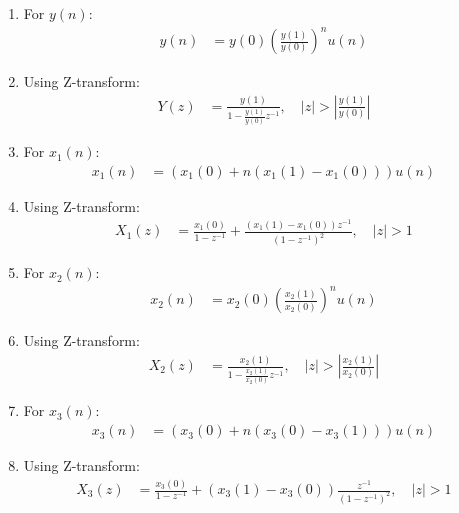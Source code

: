 \documentclass[journal,12pt,twocolumn]{IEEEtran}
\theoremstyle{remark}
\begin{document}
\begin{enumerate}

\item For $y(n)$:
    \begin{align}
        y(n) &= y(0)\left(\frac{y(1)}{y(0)}\right)^n u(n)
    \end{align}
    \item Using Z-transform:
    \begin{align}
        Y(z) &= \frac{y(1)}{1-\frac{y(1)}{y(0)}z^{-1}}, \quad \left|z\right|>\left|\frac{y(1)}{y(0)}\right|
    \end{align}
    
    \item For $x_1(n)$:
    \begin{align}
        x_1(n) &= (x_1(0) + n(x_1(1)-x_1(0)))u(n)
    \end{align}
    \item Using Z-transform:
    \begin{align}
        X_1(z) &= \frac{x_1(0)}{1-z^{-1}} + \frac{(x_1(1)-x_1(0))z^{-1}}{(1-z^{-1})^2} , \quad |z| > 1
    \end{align}

    \item For $x_2(n)$:
    \begin{align}
        x_2(n) &= x_2(0)\left(\frac{x_2(1)}{x_2(0)}\right)^n u(n)
    \end{align}
    \item Using Z-transform:
    \begin{align}
        X_2(z) &= \frac{x_2(1)}{1-\frac{x_2(1)}{x_2(0)}z^{-1}},  \quad \left|z\right|>\left|\frac{x_2(1)}{x_2(0)}\right|
    \end{align}

    \item For $x_3(n)$:
    \begin{align}
        x_3(n) &= \left(x_3(0) + n\left(x_3(0) - x_3(1)\right)\right)u(n)
    \end{align}
    \item Using Z-transform:
    \begin{align}
        X_3(z) &= \frac{x_3(0)}{1-z^{-1}} + \left(x_3(1) - x_3(0)\right)\frac{z^{-1}}{(1-z^{-1})^2} , \quad |z| > 1
    \end{align}
\end{enumerate}
\end{document}

